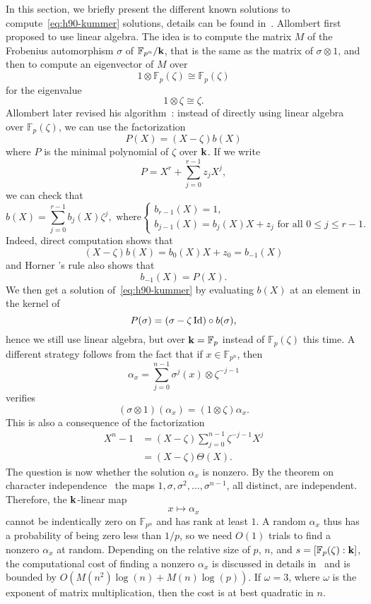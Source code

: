 In this section, we briefly present the different known solutions to
compute~\eqref{eq:h90-kummer} solutions, details can be found in~\cite{BDDFS17}.
Allombert first proposed to use linear
algebra. The idea is to compute the matrix $M$ of the Frobenius automorphism
$\sigma$ of $\mathbb{F}_{p^n}/\mathbf{k}$, that is the same as the matrix of
$\sigma\otimes1$, and then to compute an eigenvector of $M$ over
\[
  1\otimes\mathbb{F}_{p}(\zeta) \cong \mathbb{F}_{p}(\zeta)
\]
for the eigenvalue
\[
  1\otimes\zeta\cong\zeta.
\]
Allombert later revised his algorithm~\cite{Allombert02, Allombert02-rev}:
instead of directly using linear algebra over
$\mathbb{F}_{p}(\zeta)$, we can use the factorization
\[
  P(X) = (X-\zeta)b(X)
\]
where $P$ is the minimal polynomial of $\zeta$ over $\mathbf{k}$. If we write 
\[
  P = X^r + \sum_{j=0}^{r-1}z_jX^j,
\]
we can check that
\[
  b(X) = \sum_{j=0}^{r-1}b_j(X)\zeta^j,\text{ where}
  \left\{ 
    \begin{array}{l}
      b_{r-1}(X) = 1,\\
      b_{j-1}(X) = b_j(X) X + z_j\text{ for all } 0\leq j\leq r-1.
    \end{array}
  \right.
\]
Indeed, direct computation shows that
\[
  (X-\zeta)b(X) = b_0(X)X+z_0  = b_{-1}(X)
\]
and Horner 's rule also shows that
\[
  b_{-1}(X) = P(X).
\]
We then get a solution of~\eqref{eq:h90-kummer} by evaluating $b(X)$ at an
element in the kernel of 
\[
  P(\sigma)=(\sigma-\zeta\operatorname{Id})\circ b(\sigma),
\]
hence we still use linear algebra, but
over $\mathbf{k}=\mathbb{F}_p$ instead of $\mathbb{F}_{p}(\zeta)$ this time. A different
strategy follows from the fact that if $x\in\mathbb{F}_{p^n}$, then
\[
  \alpha_x=\sum_{j=0}^{n-1}\sigma^j(x)\otimes\zeta^{-j-1}
\]
verifies
\[
  (\sigma\otimes1)(\alpha_x) = (1\otimes\zeta)\alpha_x.
\]
This is also a consequence of the factorization
\begin{align*}
  X^n-1 &= (X-\zeta)\sum_{j=0}^{n-1}\zeta^{-j-1}X^j\\
  &= (X-\zeta)\Theta(X).
\end{align*}
The question is now whether the solution $\alpha_x$ is nonzero. By the theorem
on character independence~\cite[Chapter VI, §4]{Lang04} the maps
$1, \sigma, \sigma^2, \dots, \sigma^{n-1}$, all distinct, are independent.
Therefore, the $\mathbf{k}$-linear map
\[
  x\mapsto\alpha_x
\]
cannot be indentically zero on $\mathbb{F}_{p^n}$ and has rank at least $1$. A
random $\alpha_x$ thus has a probability of being zero less than $1/p$, so we
need $O(1)$ trials to find a nonzero $\alpha_x$ at random. Depending on the
relative size of $p$, $n$, and $s=\left[ \mathbb{F}_p(\zeta):\mathbf{k} \right]$, the
computational cost of finding a nonzero $\alpha_x$ is discussed in details
in~\cite{BDDFS17} and is bounded by $O(M(n^2)\log(n)+M(n)\log(p))$. If
$\omega=3$, where $\omega$ is the exponent of matrix
multiplication, then the cost is at best quadratic in $n$.


